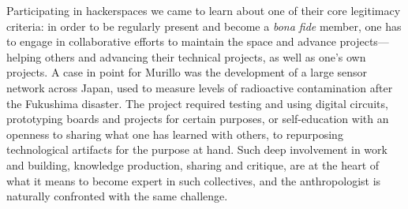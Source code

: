 \documentclass[10pt,letter,oneside]{scrartcl}
\begin{document}
Participating in hackerspaces we came to learn about one of their core
legitimacy criteria: in order to be regularly present and become a
\emph{bona fide} member, one has to engage in collaborative efforts to
maintain the space and advance projects---helping others and advancing
their technical projects, as well as one's own projects.  A case in point 
for Murillo was the development of a large sensor network across Japan, 
used to measure levels of radioactive contamination after the Fukushima
disaster.  The project required testing and using digital circuits,
prototyping boards and projects for certain purposes, or
self-education with an openness to sharing what one has learned with
others, to repurposing technological artifacts for the purpose at
hand.  Such deep involvement in work and building, knowledge
production, sharing and critique, are at the heart of what it means to
become expert in such collectives, and the anthropologist is naturally
confronted with the same challenge.





    
\end{document}
